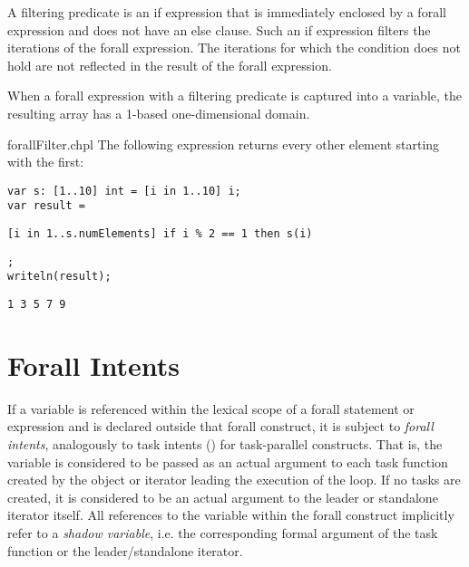 A filtering predicate is an if expression that is immediately enclosed
by a forall expression and does not have an
else clause.  Such an if expression filters the iterations of the
forall expression.  The iterations for which the condition does not
hold are not reflected in the result of the forall expression.

When a forall expression with a filtering predicate is captured into
a variable, the resulting array has a 1-based one-dimensional domain.

\begin{chapelexample}{forallFilter.chpl}
The following expression returns every other element starting with the
first:
\begin{chapelpre}
\begin{verbatim}
var s: [1..10] int = [i in 1..10] i;
var result =
\end{verbatim}
\end{chapelpre}
\begin{chapel}
\begin{verbatim}
[i in 1..s.numElements] if i % 2 == 1 then s(i)
\end{verbatim}
\end{chapel}
\begin{chapelpost}
\begin{verbatim}
;
writeln(result);
\end{verbatim}
\end{chapelpost}
\begin{chapeloutput}
\begin{verbatim}
1 3 5 7 9
\end{verbatim}
\end{chapeloutput}
\end{chapelexample}


\section{Forall Intents}
\label{Forall_Intents}

If a variable is referenced within the lexical scope of a
forall statement or expression and is declared outside
that forall construct, it is subject to \emph{forall intents},
analogously to task intents ()
for task-parallel constructs. That is, the variable is considered
to be passed as an actual argument to
each task function created by the object or iterator leading
the execution of the loop. If no tasks are created,
it is considered to be an actual argument to the leader or standalone
iterator itself. All references to the variable within the forall construct
implicitly refer to a \emph{shadow variable}, i.e.
the corresponding formal argument of the task function
or the leader/standalone iterator.

